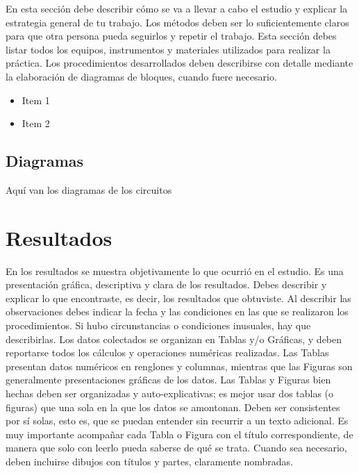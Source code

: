 \documentclass[osajnl,showpacs,superscriptaddress,10pt]{article}
\begin{document}
\begin{multicols}{2}
\begin{flushleft}
En esta sección debe describir cómo se va a llevar a cabo el estudio y explicar la estrategia
general de tu trabajo.
Los métodos deben ser lo suficientemente claros para que otra persona pueda seguirlos y
repetir el trabajo. Esta sección debes listar todos los equipos, instrumentos y materiales
utilizados para realizar la práctica. Los procedimientos desarrollados deben describirse con
detalle mediante la elaboración de diagramas de bloques, cuando fuere necesario.\\
\end{flushleft}

\begin{itemize}
    \item Item 1
    \item Item 2
\end{itemize}


\subsection{Diagramas}
 Aquí van los diagramas de los circuitos


\section{Resultados}
En los resultados se muestra objetivamente lo que ocurrió en el estudio. Es una presentación
gráfica, descriptiva y clara de los resultados. Debes describir y explicar lo que encontraste,
es decir, los resultados que obtuviste.
Al describir las observaciones debes indicar la fecha y las condiciones en las que se realizaron
los procedimientos. Si hubo circunstancias o condiciones inusuales, hay que describirlas. Los
datos colectados se organizan en Tablas y/o Gráficas, y deben reportarse todos los cálculos y
operaciones numéricas realizadas.
Las Tablas presentan datos numéricos en renglones y columnas, mientras que las Figuras son
generalmente presentaciones gráficas de los datos. Las Tablas y Figuras bien hechas deben
ser organizadas y auto-explicativas; es mejor usar dos tablas (o figuras) que una sola en la que
los datos se amontonan. Deben ser consistentes por sí solas, esto es, que se puedan entender
sin recurrir a un texto adicional.
Es muy importante acompañar cada Tabla o Figura con el título correspondiente, de manera
que solo con leerlo pueda saberse de qué se trata. Cuando sea necesario, deben incluirse
dibujos con títulos y partes, claramente nombradas.


\end{multicols}
\end{document}
